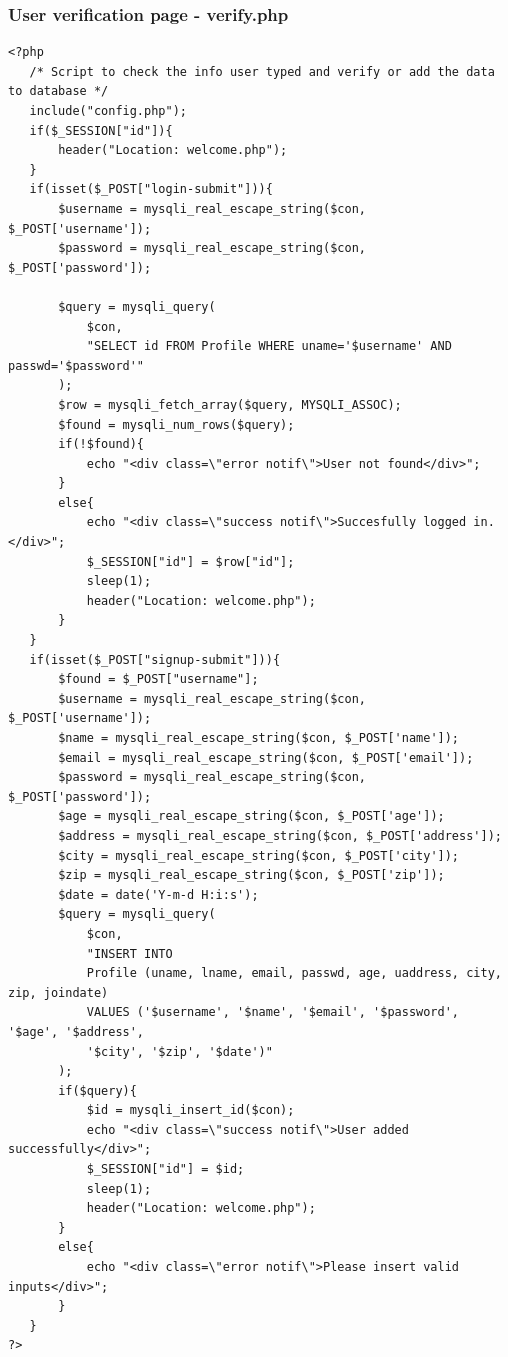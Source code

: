 \documentclass{article}
\begin{document}
\subsubsection{User verification page - verify.php}
\begin{verbatim}
<?php
   /* Script to check the info user typed and verify or add the data to database */
   include("config.php");
   if($_SESSION["id"]){
       header("Location: welcome.php");
   }
   if(isset($_POST["login-submit"])){
       $username = mysqli_real_escape_string($con, $_POST['username']);
       $password = mysqli_real_escape_string($con, $_POST['password']);
       
       $query = mysqli_query(
           $con, 
           "SELECT id FROM Profile WHERE uname='$username' AND passwd='$password'"
       );
       $row = mysqli_fetch_array($query, MYSQLI_ASSOC);
       $found = mysqli_num_rows($query);
       if(!$found){
           echo "<div class=\"error notif\">User not found</div>";
       }
       else{
           echo "<div class=\"success notif\">Succesfully logged in.</div>";
           $_SESSION["id"] = $row["id"];
           sleep(1);
           header("Location: welcome.php");
       }
   }
   if(isset($_POST["signup-submit"])){
       $found = $_POST["username"];
       $username = mysqli_real_escape_string($con, $_POST['username']);
       $name = mysqli_real_escape_string($con, $_POST['name']);
       $email = mysqli_real_escape_string($con, $_POST['email']);
       $password = mysqli_real_escape_string($con, $_POST['password']);
       $age = mysqli_real_escape_string($con, $_POST['age']);
       $address = mysqli_real_escape_string($con, $_POST['address']);
       $city = mysqli_real_escape_string($con, $_POST['city']);
       $zip = mysqli_real_escape_string($con, $_POST['zip']);
       $date = date('Y-m-d H:i:s');
       $query = mysqli_query(
           $con,
           "INSERT INTO 
           Profile (uname, lname, email, passwd, age, uaddress, city, zip, joindate)
           VALUES ('$username', '$name', '$email', '$password', '$age', '$address',
           '$city', '$zip', '$date')"
       );
       if($query){
           $id = mysqli_insert_id($con);
           echo "<div class=\"success notif\">User added successfully</div>";
           $_SESSION["id"] = $id;
           sleep(1);
           header("Location: welcome.php");
       }
       else{
           echo "<div class=\"error notif\">Please insert valid inputs</div>";
       }
   }
?>
\end{verbatim}
\end{document}
